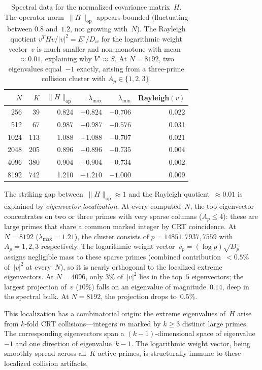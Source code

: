 \documentclass[11pt]{article}
\theoremstyle{definition}
\theoremstyle{remark}
\begin{document}
\begin{table}[ht]
\centering
\begin{tabular}{rrrrrr}
\hline
$N$ & $K$ & $\|H\|_{\mathrm{op}}$ & $\lambda_{\max}$ & $\lambda_{\min}$ &
  Rayleigh$(v)$ \\
\hline
256  & 39  & 0.824 & $+0.824$ & $-0.706$ & 0.022 \\
512  & 67  & 0.987 & $+0.987$ & $-0.576$ & 0.031 \\
1024 & 113 & 1.088 & $+1.088$ & $-0.707$ & 0.021 \\
2048 & 205 & 0.896 & $+0.896$ & $-0.735$ & 0.004 \\
4096 & 380 & 0.904 & $+0.904$ & $-0.734$ & 0.002 \\
8192 & 742 & 1.210 & $+1.210$ & $-1.000$ & 0.009 \\
\hline
\end{tabular}
\caption{Spectral data for the normalized covariance matrix~$H$.
The operator norm~$\|H\|_{\mathrm{op}}$ appears bounded
(fluctuating between $0.8$ and~$1.2$, not growing with~$N$).
The Rayleigh quotient
$v^T H v/|v|^2 = E^\circ/D_w$
for the logarithmic weight vector~$v$ is
much smaller and non-monotone with mean~$\approx 0.01$,
explaining why $V^\circ \approx S$.
At $N = 8192$, two eigenvalues equal~$-1$ exactly,
arising from a three-prime collision cluster
with $A_p \in \{1,2,3\}$.}
\label{tab:operator-norm}
\end{table}

The striking gap between~$\|H\|_{\mathrm{op}} \approx 1$
and the Rayleigh quotient~$\approx 0.01$ is explained by
\emph{eigenvector localization}.
At every computed~$N$, the top eigenvector concentrates
on two or three primes with very sparse columns
($A_p \le 4$): these are large primes that share a
common marked integer by CRT coincidence.
At $N = 8192$ ($\lambda_{\max} = 1.21$), the cluster
consists of $p = 14851, 7937, 7559$ with
$A_p = 1, 2, 3$ respectively.
The logarithmic weight vector~$v_p = (\log p)\sqrt{D_p}$
assigns negligible mass to these sparse primes
(combined contribution~$< 0.5\%$ of~$|v|^2$ at every~$N$),
so it is nearly orthogonal to the localized
extreme eigenvectors.
At $N = 4096$, only $3\%$ of~$|v|^2$ lies in
the top~$5$ eigenvectors; the largest projection
of~$v$ ($10\%$) falls on an eigenvalue of
magnitude~$0.14$, deep in the spectral bulk.
At $N = 8192$, the projection drops to~$0.5\%$.

This localization has a combinatorial origin:
the extreme eigenvalues of~$H$ arise from
$k$-fold CRT collisions---integers $m$ marked by
$k \ge 3$ distinct large primes. The corresponding
eigenvectors span a $(k{-}1)$-dimensional space
of eigenvalue~$-1$ and one direction of
eigenvalue~$k{-}1$.
The logarithmic weight vector, being smoothly
spread across all~$K$ active primes, is
structurally immune to these localized
collision artifacts.
\end{document}
